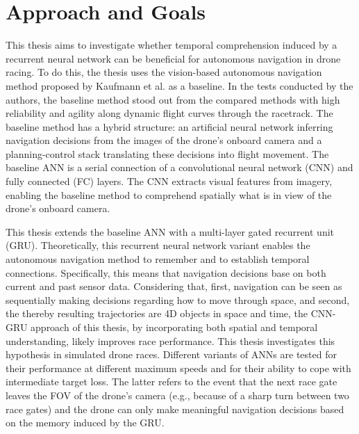 \section{Approach and Goals}



This thesis aims to 
investigate
whether temporal comprehension 
induced by a recurrent neural network
can be beneficial for
autonomous navigation in drone racing.
To do this, the thesis uses
the vision-based autonomous navigation method
proposed by Kaufmann et al. \cite{Kaufmann2018} as a baseline.
In the tests conducted by the authors, the baseline method
stood out from the compared methods
with high reliability and agility 
along dynamic flight curves through the racetrack.
The baseline method has a hybrid structure:
an artificial neural network 
inferring navigation decisions 
from the images of the drone's onboard camera
and a planning-control stack 
translating these decisions into flight movement.
The baseline ANN is a serial connection
of a convolutional neural network (CNN) 
and fully connected (FC) layers.
The CNN extracts visual features from imagery,
enabling the baseline method
to comprehend spatially what is in view of 
the drone's onboard camera.

This thesis extends the baseline ANN
with a multi-layer gated recurrent unit (GRU).
Theoretically, this
recurrent neural network variant 
enables the autonomous navigation method
to remember and to establish temporal connections.
Specifically, this means that navigation decisions 
base on both current and past sensor data.
Considering that, first, 
navigation can be seen as 
sequentially making decisions 
regarding how to move through space, and second, 
the thereby resulting trajectories 
are 4D objects in space and time, 
the CNN-GRU approach of this thesis, 
by incorporating both spatial and temporal understanding, 
likely improves race performance.
This thesis investigates this hypothesis in simulated drone races.
Different variants of ANNs 
are tested for their performance 
at different maximum speeds 
and for their ability to cope 
with intermediate target loss.
The latter refers to the event
that the next race gate leaves the FOV of the drone's camera
(e.g., because of a sharp turn between two race gates)
and the drone can only make meaningful navigation decisions
based on the memory induced by the GRU.







